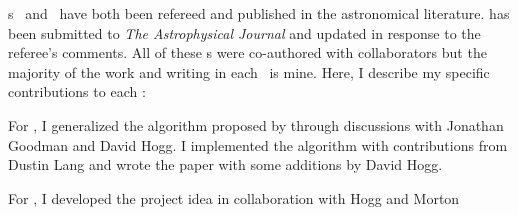 \chapname s~ and~ have both been refereed and
published in the astronomical literature.
 has been submitted to \emph{The Astrophysical Journal} and updated
in response to the referee's comments.
All of these \chapname s were co-authored with collaborators but the majority
of the work and writing in each \chapname\ is mine.
Here, I describe my specific contributions to each \chapname:
\begin{enumerate}

{\item For , I generalized the algorithm proposed by
\citet{Goodman:2010} through discussions with Jonathan Goodman and David Hogg.
I implemented the algorithm with contributions from Dustin Lang and wrote the
paper with some additions by David Hogg.}

{\item For , I developed the project idea in collaboration with
Hogg and Morton}

\end{enumerate}

